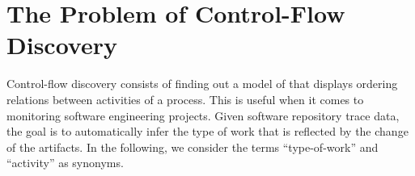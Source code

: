 

\section{The Problem of Control-Flow Discovery}
\label{sec:control-flow-background}

Control-flow discovery consists of finding out a model of that displays ordering relations between activities of a process. This is useful when it comes to monitoring software engineering projects. Given software repository trace data, the goal is to automatically infer the type of work that is reflected by the change of the artifacts. 
In the following, we consider the terms ``type-of-work'' and ``activity'' as synonyms.


